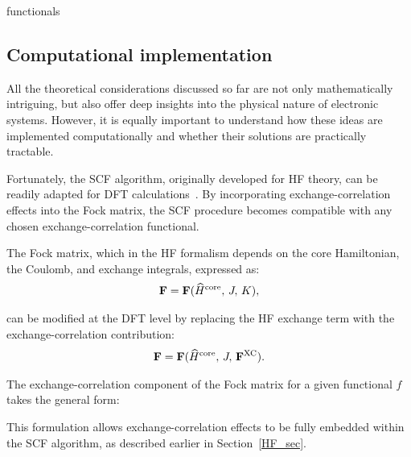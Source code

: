 {functionals}

\newpage
\subsection{Computational implementation}

All the theoretical considerations discussed so far are not only mathematically
intriguing, but also offer deep insights into the physical nature of electronic
systems. However, it is equally important to understand how these ideas are
implemented computationally and whether their solutions are practically
tractable.

Fortunately, the \gls{SCF} algorithm, originally developed for \gls{HF} theory,
can be readily adapted for \gls{DFT} calculations~\cite{Kohn1965,Engel2011}. By
incorporating exchange-correlation effects into the Fock matrix, the \gls{SCF}
procedure becomes compatible with any chosen exchange-correlation functional.

The Fock matrix, which in the \gls{HF} formalism depends on the core
Hamiltonian, the Coulomb, and exchange
integrals, expressed as:
%
\begin{align}
  \mFock = \mFock(\Ha^{\mathrm{core}},\, J,\, K),
\end{align}

\noindent can be modified at the \gls{DFT} level by replacing the
\gls{HF} exchange term with the exchange-correlation contribution:
%
\begin{align}
  \mFock = \mFock(\Ha^{\mathrm{core}},\, J,\, \mFock^{\mathrm{XC}}).
\end{align}

\noindent The exchange-correlation component of the Fock matrix for a given
functional $f$ takes the general form:
%

This formulation allows exchange-correlation effects to be fully
embedded within the \gls{SCF} algorithm, as described earlier in
Section~\ref{HF_sec}.

\newpage


